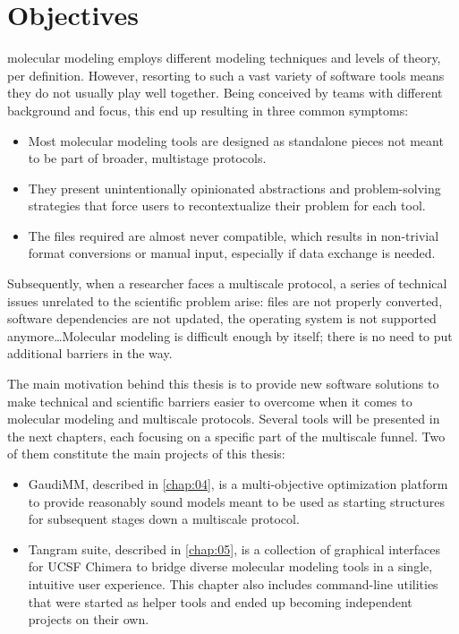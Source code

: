 \chapter{Objectives}
\label{chap:03}

 molecular modeling employs different modeling techniques and levels of theory, per definition. However, resorting to such a vast variety of software tools means they do not usually play well together. Being conceived by teams with different background and focus, this end up resulting in three common symptoms:

\begin{itemize}
	\item Most molecular modeling tools are designed as standalone pieces not meant to be part of broader, multistage protocols.

	\item They present unintentionally opinionated abstractions and problem-solving strategies that force users to recontextualize their problem for each tool.

	\item The files required are almost never compatible, which results in non-trivial format conversions or manual input, especially if data exchange is needed.
\end{itemize}

Subsequently, when a researcher faces a multiscale protocol, a series of technical issues unrelated to the scientific problem arise: files are not properly converted, software dependencies are not updated, the operating system is not supported anymore\ldots  Molecular modeling is difficult enough by itself; there is no need to put additional barriers in the way.

The main motivation behind this thesis is to provide new software solutions to make technical and scientific barriers easier to overcome when it comes to molecular modeling and multiscale protocols. Several tools will be presented in the next chapters, each focusing on a specific part of the multiscale funnel. Two of them constitute the main projects of this thesis:

\begin{itemize}
	\item GaudiMM, described in \autoref{chap:04}, is a multi-objective optimization platform to provide reasonably sound models meant to be used as starting structures for subsequent stages down a multiscale protocol.

	\item Tangram suite, described in \autoref{chap:05}, is a collection of graphical interfaces for UCSF Chimera to bridge diverse molecular modeling tools in a single, intuitive user experience. This chapter also includes command-line utilities that were started as helper tools and ended up becoming independent projects on their own.
\end{itemize}

